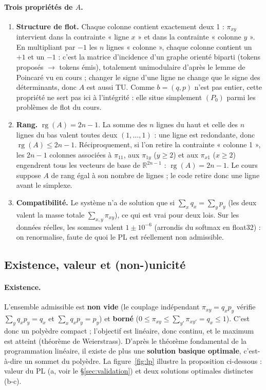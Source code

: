 \documentclass[11pt,a4paper]{article}
\newcommand{\R}{\mathbb{R}}
\newcommand{\rg}{\operatorname{rg}}
\theoremstyle{plain}
\theoremstyle{definition}
\begin{document}
\paragraph{Trois propriétés de $A$.}
\begin{enumerate}
\item \textbf{Structure de flot.} Chaque colonne contient exactement deux 1 : $\pi_{xy}$ intervient dans la contrainte « ligne $x$ » et dans la contrainte « colonne $y$ ». En multipliant par $-1$ les $n$ lignes « colonne », chaque colonne contient un $+1$ et un $-1$ : c'est la matrice d'incidence d'un graphe orienté biparti (tokens proposés $\to$ tokens émis), totalement unimodulaire d'après le lemme de Poincaré vu en cours ; changer le signe d'une ligne ne change que le signe des déterminants, donc $A$ est aussi TU. Comme $b=(q,p)$ n'est pas entier, cette propriété ne sert pas ici à l'intégrité : elle situe simplement $(P_0)$ parmi les problèmes de flot du cours.
\item \textbf{Rang.} $\rg(A)=2n-1$. La somme des $n$ lignes du haut et celle des $n$ lignes du bas valent toutes deux $(1,\dots,1)$ : une ligne est redondante, donc $\rg(A)\le2n-1$. Réciproquement, si l'on retire la contrainte « colonne 1 », les $2n-1$ colonnes associées à $\pi_{11}$, aux $\pi_{1y}$ ($y\ge2$) et aux $\pi_{x1}$ ($x\ge2$) engendrent tous les vecteurs de base de $\R^{2n-1}$ : $\rg(A)=2n-1$. Le cours suppose $A$ de rang égal à son nombre de lignes ; le code retire donc une ligne avant le simplexe.
\item \textbf{Compatibilité.} Le système n'a de solution que si $\sum_xq_x=\sum_yp_y$ (les deux valent la masse totale $\sum_{x,y}\pi_{xy}$), ce qui est vrai pour deux lois. Sur les données réelles, les sommes valent $1\pm10^{-6}$ (arrondis du softmax en float32) : on renormalise, faute de quoi le PL est réellement non admissible.
\end{enumerate}

\subsection{Existence, valeur et (non-)unicité}\label{sec:existenceI}
\paragraph{Existence.} L'ensemble admissible est \textbf{non vide} (le couplage indépendant $\pi_{xy}=q_xp_y$ vérifie $\sum_yq_xp_y=q_x$ et $\sum_xq_xp_y=p_y$) et \textbf{borné} ($0\le\pi_{xy}\le\sum_{y'}\pi_{xy'}=q_x\le1$). C'est donc un polyèdre compact ; l'objectif est linéaire, donc continu, et le maximum est atteint (théorème de Weierstrass). D'après le théorème fondamental de la programmation linéaire, il existe de plus une \textbf{solution basique optimale}, c'est-à-dire un sommet du polyèdre. La figure~\ref{fig:lp} illustre la proposition ci-dessous : valeur du PL (a, voir le §\ref{sec:validation}) et deux solutions optimales distinctes (b-c).
\end{document}
